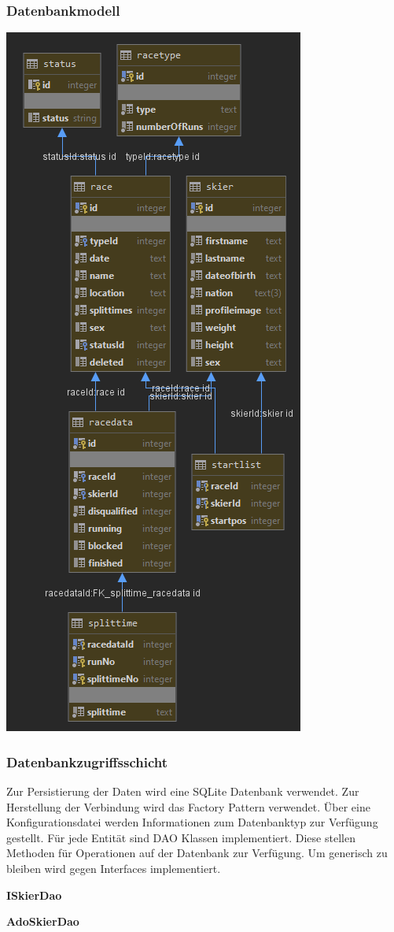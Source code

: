 \documentclass[a4paper, 12pt]{article}
\begin{document}
	\subsubsection{Datenbankmodell}
	\includegraphics[width=.5\textwidth]{img/huraceDB.png}
	\newpage
	\subsubsection{Datenbankzugriffsschicht}
	Zur Persistierung der Daten wird eine SQLite Datenbank verwendet. Zur Herstellung der Verbindung wird das Factory Pattern verwendet. Über eine Konfigurationsdatei werden Informationen zum Datenbanktyp zur Verfügung gestellt. Für jede Entität sind DAO Klassen implementiert. Diese stellen Methoden für Operationen auf der Datenbank zur Verfügung. Um generisch zu bleiben wird gegen Interfaces implementiert.
	\newline
	 
	\textbf{ISkierDao}
	
	\textbf{AdoSkierDao}
	
	
\end{document}
